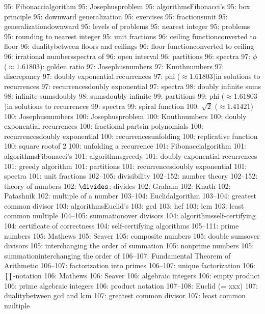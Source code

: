  95: Fibonacci\sub algorithm
 95: Josephus\sub problem
 95: algorithms\sub Fibonacci's
 95: box principle
 95: downward generalization
 95: exercises
 95: fractions\sub unit
 95: generalization\sub downward
 95: levels of problems
 95: nearest integer
 95: problems
 95: rounding to nearest integer
 95: unit fractions
 96: ceiling function\sub converted to floor
 96: duality\sub between floors and ceilings
 96: floor function\sub converted to ceiling
 96: irrational numbers\sub spectra of
 96: open interval
 96: partitions
 96: spectra
 97: $\phi$ ($\approx1.61803$): golden ratio
 97: Josephus\sub numbers
 97: Knuth\sub numbers
 97: discrepancy
 97: doubly exponential recurrences
 97: phi ($\approx1.61803$)\sub in solutions to recurrences
 97: recurrences\sub doubly exponential
 97: spectra
 98: doubly infinite sums
 98: infinite sums\sub doubly
 98: sums\sub doubly infinite
 99: partitions
 99: phi ($\approx1.61803$)\sub in solutions to recurrences
 99: spectra
 99: spiral function
100: $\sqrt2$ ($\approx1.41421$)
100: Josephus\sub numbers
100: Josephus\sub problem
100: Knuth\sub numbers
100: doubly exponential recurrences
100: fractional parts\sub in polynomials
100: recurrences\sub doubly exponential
100: recurrences\sub unfolding
100: replicative function
100: square root\sub of $2$
100: unfolding a recurrence
101: Fibonacci\sub algorithm
101: algorithms\sub Fibonacci's
101: algorithms\sub greedy
101: doubly exponential recurrences
101: greedy algorithm
101: partitions
101: recurrences\sub doubly exponential
101: spectra
101: unit fractions
102--105: divisibility
102--152: number theory
102--152: theory of numbers
102: $\divides$: divides
102: Graham
102: Knuth
102: Patashnik
102: multiple of a number
103--104: Euclid\sub algorithm
103--104: greatest common divisor
103: algorithms\sub Euclid's
103: gcd
103: hcf
103: lcm
103: least common multiple
104--105: summation\sub over divisors
104: algorithms\sub self-certifying
104: certificate of correctness
104: self-certifying algorithms
105--111: prime numbers
105: Mathews
105: Seaver
105: composite numbers
105: double sums\sub over divisors
105: interchanging the order of summation
105: nonprime numbers
105: summation\sub interchanging the order of
106--107: Fundamental Theorem of Arithmetic
106--107: factorization into primes
106--107: unique factorization
106: $\prod$-notation
106: Mathews
106: Seaver
106: algebraic integers
106: empty product
106: prime algebraic integers
106: product notation
107--108: Euclid (= xxx)
107: duality\sub between gcd and lcm
107: greatest common divisor
107: least common multiple

